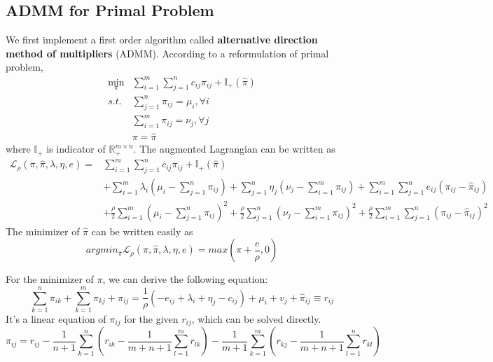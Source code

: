 \documentclass{article}
\begin{document}
\subsection{ADMM for Primal Problem}
We first implement a first order algorithm called \textbf{alternative direction method of multipliers} (ADMM). According to a reformulation of primal problem, 
\begin{equation} \label{Eq:StdLP_admm_primal}
  \begin{aligned}
  \min_{\pi} & \sum_{i=1}^{m}\sum_{j=1}^{n} c_{ i j } \pi_{ i j }+\mathbb{I}_{+}(\hat{\pi})\\
  s.t. & \sum_{j=1}^{n}\pi_{ i j } = \mu_i, \forall i\\
  & \sum_{i=1}^{m}\pi_{ i j } = \nu_j, \forall j \\
  & \pi=\hat{\pi}
  \end{aligned}
\end{equation}
where $\mathbb{I}_{+}$ is indicator of $\mathbb{R}^{m\times n}_{+}$. The augmented Lagrangian can be written as 
\begin{equation} \label{Eq:admm_primal}
  \begin{aligned}
\mathcal{L}_{\rho}(\pi,\hat{\pi},\lambda,\eta,e)=&\sum_{i=1}^{m}\sum_{j=1}^{n} c_{ i j } \pi_{ i j }+\mathbb{I}_{+}(\hat{\pi})\\
&+\sum_{i=1}^{m}\lambda_{i}\left(\mu_i-\sum_{j=1}^{n}\pi_{ i j }\right)+\sum_{j=1}^{n}\eta_{j}\left(\nu_j-\sum_{i=1}^{m}\pi_{ i j }\right)+\sum_{i=1}^{m}\sum_{j=1}^{n}e_{ij}\left(\pi_{ij}-\hat{\pi}_{ij}\right)\\
&+\frac{\rho}{2}\sum_{i=1}^{m}\left(\mu_i-\sum_{j=1}^{n}\pi_{ i j }\right)^{2}+\frac{\rho}{2}\sum_{j=1}^{n}\left(\nu_j-\sum_{i=1}^{m}\pi_{ i j }\right)^{2}+\frac{\rho}{2}\sum_{i=1}^{m}\sum_{j=1}^{n}\left(\pi_{ij}-\hat{\pi}_{ij}\right)^{2}
\end{aligned}
\end{equation}
The minimizer of $\hat{\pi}$ can be written easily as
\begin{equation}
  argmin_{\hat{\pi}}\mathcal{L}_{\rho}(\pi,\hat{\pi},\lambda,\eta,e)=max\left(\pi+\frac{e}{\rho}, 0\right)
\end{equation}

For the minimizer of $\pi$, we can derive the following equation:
\begin{equation}
  \sum _ { k = 1 } ^ { n } \pi _ { i k } + \sum _ { k = 1 } ^ { m } \pi _ { k j } + \pi_ { i j } = \frac { 1 } { \rho } \left(-e _ { i j } + \lambda _ { i } + \eta _ { j } - c _ { i j } \right) + \mu _ { i } + v _ { j } + \hat{ \pi} _ { i j } \equiv r _ { i j }
\end{equation}
It's a linear equation of $\pi_{ij}$ for the given $r_{ij}$,  which can be solved directly.
\begin{equation}
\pi_ { i j } = r _ { i j } - \frac { 1 } { n + 1 } \sum _ { k = 1 } ^ { n } \left( r _ { i k } - \frac { 1 } { m + n + 1 } \sum _ { l = 1 } ^ { m } r _ { l k } \right) - \frac { 1 } { m + 1 } \sum _ { k = 1 } ^ { m } \left( r _ { k j } - \frac { 1 } { m + n + 1 } \sum _ { l = 1 } ^ { n } r _ { k l } \right)
\end{equation}
\end{document}
